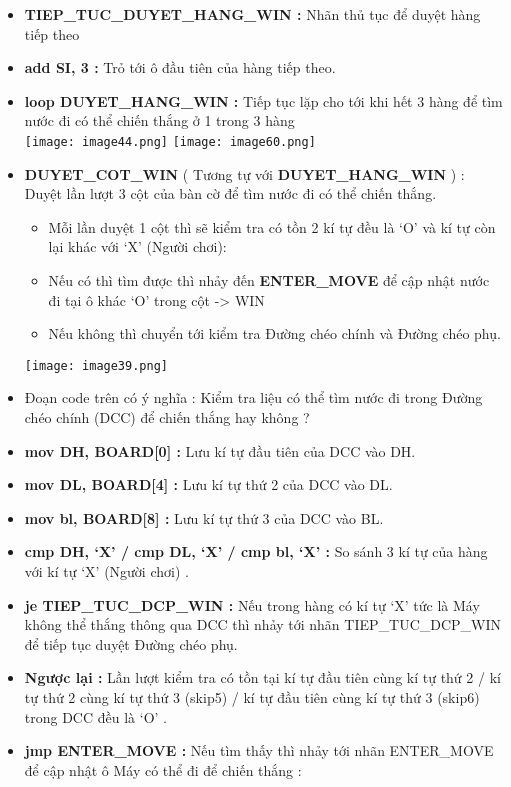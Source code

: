 \begin{itemize}
    \item \textbf{TIEP\_TUC\_DUYET\_HANG\_WIN :} Nhãn thủ tục để duyệt hàng tiếp theo
    \item \textbf{add SI, 3 :} Trỏ tới ô đầu tiên của hàng tiếp theo.
    \item \textbf{loop DUYET\_HANG\_WIN :} Tiếp tục lặp cho tới khi hết 3 hàng để  tìm nước đi có thể chiến thắng ở 1 trong 3 hàng \\
    \texttt{[image: image44.png]}
    \texttt{[image: image60.png]}
    \item \textbf{DUYET\_COT\_WIN} ( Tương tự với \textbf{DUYET\_HANG\_WIN} )  : Duyệt lần lượt 3 cột của bàn cờ để tìm nước đi có thể chiến thắng.
    \begin{itemize}
        \item Mỗi lần duyệt 1 cột thì sẽ kiểm tra có tồn 2 kí tự đều là ‘O’ và kí tự còn lại khác với ‘X’ (Người chơi): 
        \item Nếu có thì tìm được thì nhảy đến \textbf{ENTER\_MOVE} để cập nhật nước đi tại ô khác ‘O’ trong cột -> WIN
        \item Nếu không thì chuyển tới kiểm tra Đường chéo chính và Đường chéo phụ.
    \end{itemize}
    \texttt{[image: image39.png]}
    \item Đoạn code trên có ý nghĩa : Kiểm tra liệu có thể tìm nước đi trong Đường chéo chính (DCC) để chiến thắng hay không ?
    \item \textbf{mov DH, BOARD[0] :} Lưu kí tự đầu tiên của DCC vào DH.
    \item \textbf{mov DL, BOARD[4] :} Lưu kí tự thứ 2 của DCC vào DL.
    \item \textbf{mov bl, BOARD[8] :} Lưu kí tự thứ 3 của DCC vào BL.
    \item \textbf{cmp DH, ‘X’ / cmp DL, ‘X’ / cmp bl, ‘X’ : } So sánh 3 kí tự của hàng với kí tự ‘X’ (Người chơi) .
    \item \textbf{je TIEP\_TUC\_DCP\_WIN :} Nếu trong hàng có kí tự ‘X’ tức là Máy không thể thắng thông qua DCC thì nhảy tới nhãn TIEP\_TUC\_DCP\_WIN để tiếp tục duyệt Đường chéo phụ.
    \item \textbf{Ngược lại : }Lần lượt kiểm tra có tồn tại kí tự đầu tiên cùng kí tự thứ 2 / kí tự thứ 2 cùng kí tự thứ 3 (skip5) / kí tự đầu tiên cùng kí tự thứ 3 (skip6) trong DCC đều là ‘O’ .
    \item \textbf{jmp ENTER\_MOVE :} Nếu tìm thấy thì nhảy tới nhãn ENTER\_MOVE để cập nhật ô Máy có thể đi để chiến thắng : 

\end{itemize}
